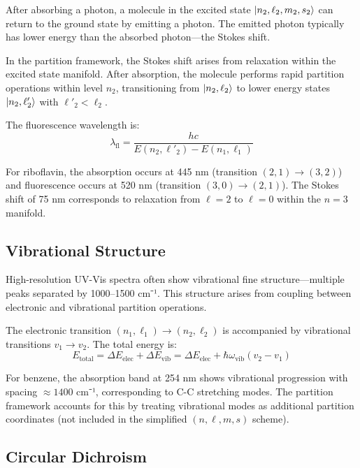 \documentclass[twocolumn,superscriptaddress,prb,10pt]{revtex4-2}
\begin{document}
After absorbing a photon, a molecule in the excited state $\ket{n_2,\ell_2,m_2,s_2}$ can return to the ground state by emitting a photon. The emitted photon typically has lower energy than the absorbed photon—the Stokes shift.

In the partition framework, the Stokes shift arises from relaxation within the excited state manifold. After absorption, the molecule performs rapid partition operations within level $n_2$, transitioning from $\ket{n_2,\ell_2}$ to lower energy states $\ket{n_2,\ell'_2}$ with $\ell'_2 < \ell_2$.

The fluorescence wavelength is:
\begin{equation}
\lambda_{\text{fl}} = \frac{hc}{E(n_2,\ell'_2) - E(n_1,\ell_1)}
\label{eq:fluorescence}
\end{equation}

For riboflavin, the absorption occurs at 445 nm (transition $(2,1) \to (3,2)$) and fluorescence occurs at 520 nm (transition $(3,0) \to (2,1)$). The Stokes shift of 75 nm corresponds to relaxation from $\ell = 2$ to $\ell = 0$ within the $n = 3$ manifold.

\subsection{Vibrational Structure}

High-resolution UV-Vis spectra often show vibrational fine structure—multiple peaks separated by 1000--1500 cm⁻¹. This structure arises from coupling between electronic and vibrational partition operations.

The electronic transition $(n_1,\ell_1) \to (n_2,\ell_2)$ is accompanied by vibrational transitions $v_1 \to v_2$. The total energy is:
\begin{equation}
E_{\text{total}} = \Delta E_{\text{elec}} + \Delta E_{\text{vib}} = \Delta E_{\text{elec}} + \hbar\omega_{\text{vib}}(v_2 - v_1)
\label{eq:vibronic}
\end{equation}

For benzene, the absorption band at 254 nm shows vibrational progression with spacing $\approx 1400$ cm⁻¹, corresponding to C-C stretching modes. The partition framework accounts for this by treating vibrational modes as additional partition coordinates (not included in the simplified $(n,\ell,m,s)$ scheme).

\subsection{Circular Dichroism}
\end{document}
